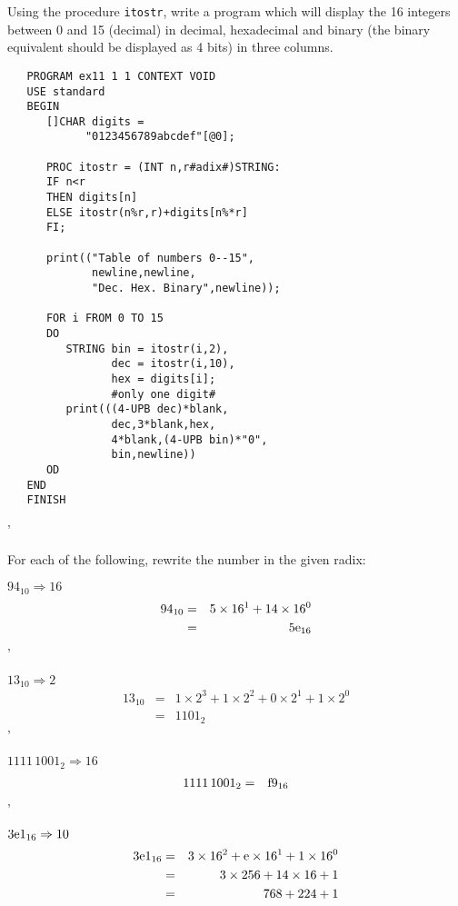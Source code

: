 \begin{exercise}
\item Using the procedure \verb|itostr|, write a program which will
display the 16 integers between 0 and 15 (decimal) in decimal,
hexadecimal and binary (the binary equivalent should be displayed as 4
bits) in three columns. \ans
\begin{verbatim}
   PROGRAM ex11 1 1 CONTEXT VOID
   USE standard
   BEGIN
      []CHAR digits =
            "0123456789abcdef"[@0];

      PROC itostr = (INT n,r#adix#)STRING:
      IF n<r
      THEN digits[n]
      ELSE itostr(n%r,r)+digits[n%*r]
      FI;

      print(("Table of numbers 0--15",
             newline,newline,
             "Dec. Hex. Binary",newline));

      FOR i FROM 0 TO 15
      DO
         STRING bin = itostr(i,2),
                dec = itostr(i,10),
                hex = digits[i];
                #only one digit#
         print(((4-UPB dec)*blank,
                dec,3*blank,hex,
                4*blank,(4-UPB bin)*"0",
                bin,newline))
      OD
   END
   FINISH
\end{verbatim}
'
\item For each of the following, rewrite the number in the given radix:
\begin{subex}
\item $94_{10}\Rightarrow16$ \subans \begin{eqnarray*}
94_{10}&=&5\times16^1+14\times16^0\\
       &=&5\hbox{e}_{16}
\end{eqnarray*}
'
\item $13_{10}\Rightarrow2$ \subans \begin{eqnarray*}
13_{10}&=&1\times2^3+1\times2^2+0\times2^1+1\times2^0\\
       &=&1101_2
\end{eqnarray*}
'
\item $1111\,1001_2\Rightarrow16$ \subans \begin{eqnarray*}
1111\,1001_2&=&\hbox{f}9_{16}
\end{eqnarray*}
'
\item $3\hbox{e}1_{16}\Rightarrow 10$ \subans \begin{eqnarray*}
3\hbox{e}1_{16}&=&3\times16^2+\hbox{e}\times16^1+1\times16^0\\
               &=&3\times256+14\times16+1\\
               &=&768+224+1\\

\end{eqnarray*}
\end{subex}
\end{exercise}
